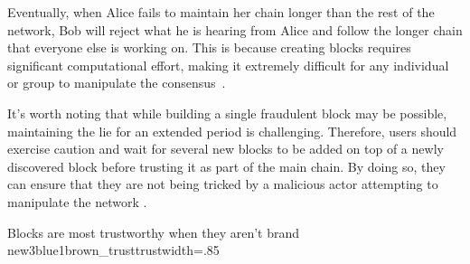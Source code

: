 Eventually, when Alice fails to maintain her chain longer than the rest of the network, Bob will reject what he is
hearing from Alice and follow the longer chain that everyone else is working on. This is because creating blocks
requires significant computational effort, making it extremely difficult for any individual or group to manipulate the
consensus~\cite{szabo2005bit}.

It's worth noting that while building a single fraudulent block may be possible, maintaining the lie for an extended
period is challenging. Therefore, users should exercise caution and wait for several new blocks to be added on top of a
newly discovered block before trusting it as part of the main chain. By doing so, they can ensure that they are not
being tricked by a malicious actor attempting to manipulate the network \cite{dupont2019cryptocurrencies}.

 {Blocks are most trustworthy when
they aren't brand new}{3blue1brown_trust}{trust}{width=.85\textwidth}%
